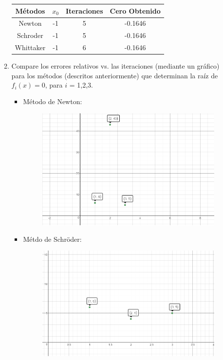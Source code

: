 \documentclass{udparticle}
\begin{document}
\begin{enumerate}
\begin{enumerate}
		\begin{table}[H]
			\centering
			\begin{tabular}{|c|c|c|c|}
				\hline
				Métodos & $x_{0}$ & Iteraciones & Cero Obtenido \\
				\hline
				Newton & -1 & 5 & -0.1646 \\
				\hline
				Schroder & -1 & 5 & -0.1646\\
				\hline
				Whittaker & -1 & 6 & -0.1646 \\
				\hline				
			\end{tabular}
		\end{table}		
\newpage			
		\item Compare los errores relativos vs. las iteraciones (mediante un gráfico) para los métodos (descritos
			anteriormente) que determinan la raíz de $f_{i}(x)=0$, para $i$ = 1,2,3.	
			\begin{itemize}
				\item Método de Newton:
				\begin{figure}[H]
					\centering		\includegraphics[width=10cm]{NewtonEj6} %
				\end{figure}
								\item Métdo de Schröder: 
				 \begin{figure}[H]
					\centering
					\includegraphics[width=10cm]{SchroderEj6} 
				\end{figure}	
				 

\end{itemize}
\end{enumerate}
\end{enumerate}
\end{document}
